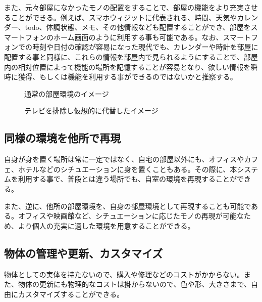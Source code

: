 また、元々部屋になかったモノの配置をすることで、部屋の機能をより充実させることができる。例えば、スマホウィジットに代表される、時間、天気やカレンダー、todo、体調状態、メモ、その他情報なども配置することができ、部屋をスマートフォンのホーム画面のように利用する事も可能である。なお、スマートフォンでの時刻や日付の確認が容易になった現代でも、カレンダーや時計を部屋に配置する事と同様に、これらの情報を部屋内で見られるようにすることで、部屋内の相対位置によって機能の場所を記憶することが容易となり、欲しい情報を瞬時に獲得、もしくは機能を利用する事ができるのではないかと推察する。

\begin{figure}[htbp]
    \begin{minipage}{0.5\hsize}
      \begin{center}
      \end{center}
      \caption{通常の部屋環境のイメージ}
    \end{minipage}
    \begin{minipage}{0.5\hsize}
      \begin{center}
      \end{center}
      \caption{テレビを排除し仮想的に代替したイメージ}
    \end{minipage}
  \end{figure}

\subsection{同様の環境を他所で再現}

自身が身を置く場所は常に一定ではなく、自宅の部屋以外にも、オフィスやカフェ、ホテルなどのシチュエーションに身を置くこともある。その際に、本システムを利用する事で、普段とは違う場所でも、自室の環境を再現することができる。

また、逆に、他所の部屋環境を、自身の部屋環境として再現することも可能である。オフィスや映画館など、シチュエーションに応じたモノの再現が可能なため、より個人の充実に適した環境を用意することができる。

\subsection{物体の管理や更新、カスタマイズ}

物体としての実体を持たないので、購入や修理などのコストがかからない。また、物体の更新にも物理的なコストは掛からないので、色や形、大きさまで、自由にカスタマイズすることができる。

